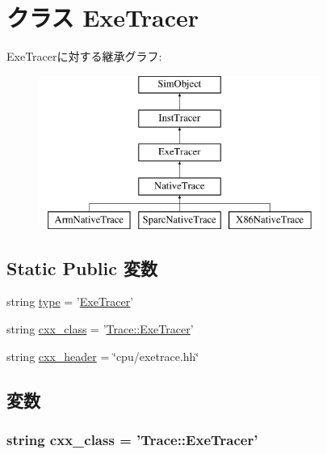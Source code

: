 \hypertarget{classExeTracer_1_1ExeTracer}{
\section{クラス ExeTracer}
\label{classExeTracer_1_1ExeTracer}
}
ExeTracerに対する継承グラフ:\begin{figure}[H]
\begin{center}
\leavevmode
\includegraphics[height=5cm]{classExeTracer_1_1ExeTracer}
\end{center}
\end{figure}
\subsection*{Static Public 変数}
\begin{DoxyCompactItemize}
\item 
string \hyperlink{classExeTracer_1_1ExeTracer_acce15679d830831b0bbe8ebc2a60b2ca}{type} = '\hyperlink{classExeTracer_1_1ExeTracer}{ExeTracer}'
\item 
string \hyperlink{classExeTracer_1_1ExeTracer_a58cd55cd4023648e138237cfc0822ae3}{cxx\_\-class} = '\hyperlink{classTrace_1_1ExeTracer}{Trace::ExeTracer}'
\item 
string \hyperlink{classExeTracer_1_1ExeTracer_a17da7064bc5c518791f0c891eff05fda}{cxx\_\-header} = \char`\"{}cpu/exetrace.hh\char`\"{}
\end{DoxyCompactItemize}


\subsection{変数}
\hypertarget{classExeTracer_1_1ExeTracer_a58cd55cd4023648e138237cfc0822ae3}{
\subsubsection[{cxx\_\-class}]{\setlength{\rightskip}{0pt plus 5cm}string {\bf cxx\_\-class} = '{\bf Trace::ExeTracer}'}}
\label{classExeTracer_1_1ExeTracer_a58cd55cd4023648e138237cfc0822ae3}


